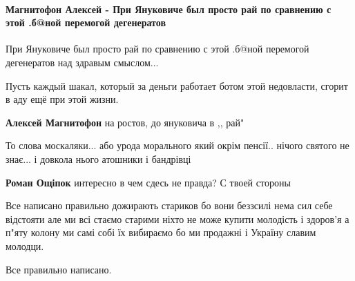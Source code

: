  
 
 
 
 
\paragraph{Магнитофон Алексей - При Януковиче был просто рай по сравнению с этой .б@ной перемогой дегенератов}

\begin{itemize}


При Януковиче был просто рай по сравнению с этой .б@ной перемогой дегенератов
над здравым смыслом...

Пусть каждый шакал, который за деньги работает ботом этой недовласти, сгорит в
аду ещё при этой жизни.

\begin{itemize}
 
\textbf{Алексей Магнитофон} на ростов, до януковича в ,, рай"
\end{itemize}

 
То слова москаляки... або урода морального який окрім пенсії.. нічого святого не
знає... і довкола нього атошники і бандрівці

\begin{itemize}

 
\textbf{Роман Ощіпок} интересно в чем сдесь не правда? С твоей стороны
\end{itemize}


Все написано правильно дожирають стариков бо вони беззсилі нема сил себе
відстояти але ми всі стаємо старими ніхто не може купити молодість і здоров'я а
п"яту колону ми самі собі їх вибираємо бо ми продажні і Україну славим молодци.

Все правильно написано.

\end{itemize}

